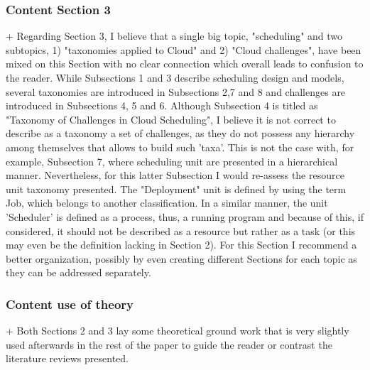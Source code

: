 

\subsubsection{Content Section 3}

+ Regarding Section 3, I believe that a single big topic, "scheduling"
and two subtopics, 1) "taxonomies applied to Cloud" and 2) "Cloud
challenges", have been mixed on this Section with no clear connection
which overall leads to confusion to the reader. While Subsections 1
and 3 describe scheduling design and models, several taxonomies are
introduced in Subsections 2,7 and 8 and challenges are introduced in
Subsections 4, 5 and 6. Although Subsection 4 is titled as "Taxonomy
of Challenges in Cloud Scheduling", I believe it is not correct to
describe as a taxonomy a set of challenges, as they do not possess any
hierarchy among themselves that allows to build such 'taxa'. This is
not the case with, for example, Subsection 7, where scheduling unit
are presented in a hierarchical manner. Nevertheless, for this latter
Subsection I would re-assess the resource unit taxonomy presented. The
"Deployment" unit is defined by using the term Job, which belongs to
another classification. In a similar manner, the unit 'Scheduler' is
defined as a process, thus, a running program and because of this, if
considered, it should not be described as a resource but rather as a
task (or this may even be the definition lacking in Section 2). For
this Section I recommend a better organization, possibly by even
creating different Sections for each topic as they can be addressed
separately.



\subsubsection{Content use of theory}

+ Both Sections 2 and 3 lay some theoretical ground work that is very
slightly used afterwards in the rest of the paper to guide the reader
or contrast the literature reviews presented.




